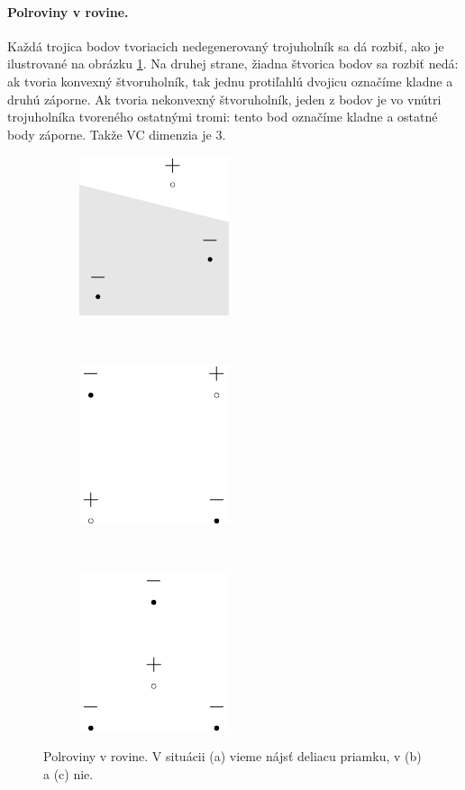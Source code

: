 \paragraph{Polroviny v rovine.} Každá trojica bodov tvoriacich
nedegenerovaný trojuholník sa dá rozbiť, ako je ilustrované na
obrázku \ref{vc:halfplane}. Na druhej strane, žiadna štvorica bodov
sa rozbiť nedá: ak tvoria konvexný štvoruholník, tak jednu protiľahlú 
dvojicu označíme kladne a druhú záporne. Ak tvoria nekonvexný 
štvoruholník, jeden z bodov je vo vnútri trojuholníka tvoreného 
ostatnými tromi: tento bod označíme kladne a ostatné body záporne.
Takže VC dimenzia je $3$.

\begin{figure}
  \centering
  \begin{subfigure}[b]{0.3\linewidth}
    \centering
    \includegraphics[scale=1]{obrazky/halfplane1.pdf}
    \caption{}
  \end{subfigure}
  ~
  \begin{subfigure}[b]{0.3\linewidth}
    \centering
    \includegraphics[scale=1]{obrazky/halfplane2.pdf}
    \caption{}
  \end{subfigure}
  ~
  \begin{subfigure}[b]{0.3\linewidth}
    \centering
    \includegraphics[scale=1]{obrazky/halfplane3.pdf}
    \caption{}
  \end{subfigure}
  \caption{Polroviny v rovine. V situácii (a) vieme nájsť deliacu priamku, v (b) a (c) nie.}
  \label{vc:halfplane}
\end{figure}

